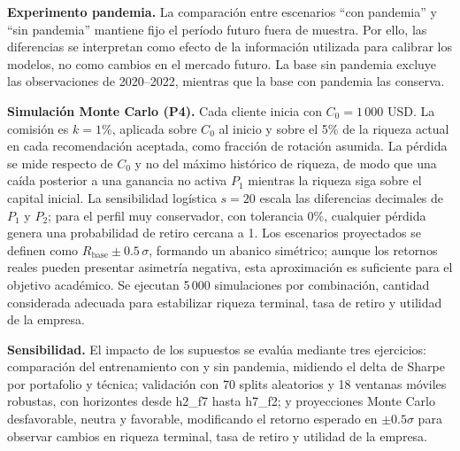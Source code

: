 \textbf{Experimento pandemia.} La comparaci\'on entre escenarios ``con pandemia'' y ``sin pandemia'' mantiene fijo el per\'iodo futuro fuera de muestra. Por ello, las diferencias se interpretan como efecto de la informaci\'on utilizada para calibrar los modelos, no como cambios en el mercado futuro. La base sin pandemia excluye las observaciones de 2020--2022, mientras que la base con pandemia las conserva.

\textbf{Simulaci\'on Monte Carlo (P4).} Cada cliente inicia con $C_0 = 1\,000$ USD. La comisi\'on es $k = 1\%$, aplicada sobre $C_0$ al inicio y sobre el 5\% de la riqueza actual en cada recomendaci\'on aceptada, como fracci\'on de rotaci\'on asumida. La p\'erdida se mide respecto de $C_0$ y no del m\'aximo hist\'orico de riqueza, de modo que una ca\'ida posterior a una ganancia no activa $P_1$ mientras la riqueza siga sobre el capital inicial. La sensibilidad log\'istica $s = 20$ escala las diferencias decimales de $P_1$ y $P_2$; para el perfil muy conservador, con tolerancia 0\%, cualquier p\'erdida genera una probabilidad de retiro cercana a 1. Los escenarios proyectados se definen como $R_{\text{base}} \pm 0.5\,\sigma$, formando un abanico sim\'etrico; aunque los retornos reales pueden presentar asimetr\'ia negativa, esta aproximaci\'on es suficiente para el objetivo acad\'emico. Se ejecutan 5\,000 simulaciones por combinaci\'on, cantidad considerada adecuada para estabilizar riqueza terminal, tasa de retiro y utilidad de la empresa.

\textbf{Sensibilidad.} El impacto de los supuestos se eval\'ua mediante tres ejercicios: comparaci\'on del entrenamiento con y sin pandemia, midiendo el delta de Sharpe por portafolio y t\'ecnica; validaci\'on con 70 splits aleatorios y 18 ventanas m\'oviles robustas, con horizontes desde h2\_f7 hasta h7\_f2; y proyecciones Monte Carlo desfavorable, neutra y favorable, modificando el retorno esperado en $\pm 0.5\sigma$ para observar cambios en riqueza terminal, tasa de retiro y utilidad de la empresa.
